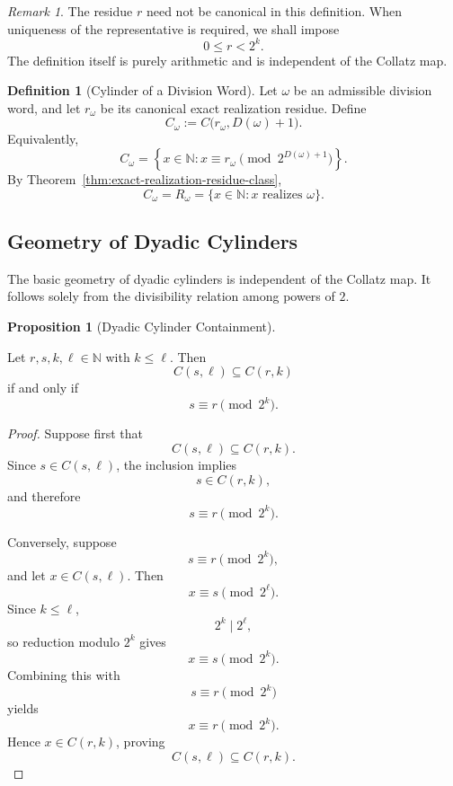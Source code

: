 \documentclass[12pt, oneside]{article}
\numberwithin{equation}{section}
\theoremstyle{definition}
\newtheorem{definition}{Definition}[section]
\newtheorem{proposition}{Proposition}[section]
\theoremstyle{plain}
\theoremstyle{remark}
\newtheorem*{remark}{Remark}
\begin{document}
\begin{remark}
The residue \(r\) need not be canonical in this definition. When uniqueness
of the representative is required, we shall impose
\[
0\le r<2^k.
\]
The definition itself is purely arithmetic and is independent of the
Collatz map.
\end{remark}

\begin{definition}[Cylinder of a Division Word]
Let \(\omega\) be an admissible division word, and let \(r_\omega\) be its
canonical exact realization residue. Define
\[
C_\omega
:=
C\bigl(r_\omega,D(\omega)+1\bigr).
\]
Equivalently,
\[
C_\omega
=
\left\{
x\in\mathbb N :
x\equiv r_\omega
\pmod{2^{D(\omega)+1}}
\right\}.
\]
By Theorem~\ref{thm:exact-realization-residue-class},
\[
C_\omega
=
R_\omega
=
\{x\in\mathbb N:x\text{ realizes }\omega\}.
\]
\end{definition}

\subsection{Geometry of Dyadic Cylinders}

The basic geometry of dyadic cylinders is independent of the Collatz map.
It follows solely from the divisibility relation among powers of \(2\).

\begin{proposition}[Dyadic Cylinder Containment]
\label{prop:dyadic-cylinder-containment}

Let \(r,s,k,\ell\in\mathbb N\) with \(k\le\ell\). Then
\[
C(s,\ell)\subseteq C(r,k)
\]
if and only if
\[
s\equiv r\pmod{2^k}.
\]
\end{proposition}

\begin{proof}
Suppose first that
\[
C(s,\ell)\subseteq C(r,k).
\]
Since \(s\in C(s,\ell)\), the inclusion implies
\[
s\in C(r,k),
\]
and therefore
\[
s\equiv r\pmod{2^k}.
\]

Conversely, suppose
\[
s\equiv r\pmod{2^k},
\]
and let \(x\in C(s,\ell)\). Then
\[
x\equiv s\pmod{2^\ell}.
\]
Since \(k\le\ell\),
\[
2^k\mid2^\ell,
\]
so reduction modulo \(2^k\) gives
\[
x\equiv s\pmod{2^k}.
\]
Combining this with
\[
s\equiv r\pmod{2^k}
\]
yields
\[
x\equiv r\pmod{2^k}.
\]
Hence \(x\in C(r,k)\), proving
\[
C(s,\ell)\subseteq C(r,k).
\]
\end{proof}
\end{document}
